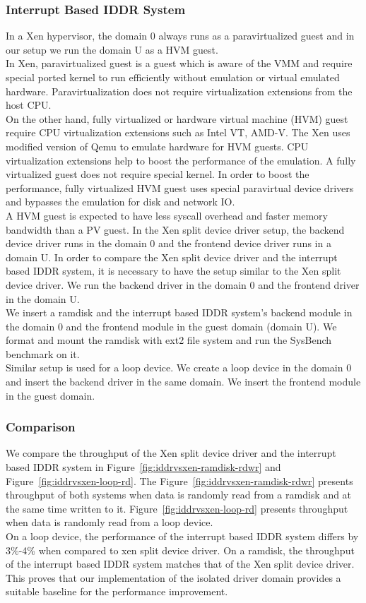 \subsubsection*{Interrupt Based IDDR System}
In a Xen hypervisor, the domain 0 always runs as a paravirtualized guest and in our setup we run the domain U as a HVM guest.
\\[3mm] 
In Xen, paravirtualized guest is a guest which is aware of the VMM and require special ported kernel to run efficiently without emulation or virtual emulated hardware. Paravirtualization does not require virtualization extensions from the host CPU. 
\\[3mm]
On the other hand, fully virtualized or hardware virtual machine (HVM) guest require CPU virtualization extensions such as Intel VT, AMD-V. The Xen uses modified version of Qemu to emulate hardware for HVM guests. CPU virtualization extensions help to boost the performance of the emulation. A fully virtualized guest does not require special kernel. In order to boost the performance, fully virtualized HVM guest uses special paravirtual device drivers and bypasses the emulation for disk and network IO.
\\[3mm]
A HVM guest is expected to have less syscall overhead and faster memory bandwidth than a PV guest. In the Xen split device driver setup, the backend device driver runs in the domain 0 and the frontend device driver runs in a domain U. In order to compare the Xen split device driver and the interrupt based IDDR system, it is necessary to have the setup similar to the Xen split device driver. We run the backend driver in the domain 0 and the frontend driver in the domain U.
\\[3mm]
We insert a ramdisk and the interrupt based IDDR system's backend module in the domain 0 and the frontend module in the guest domain (domain U). We format and mount the ramdisk with ext2 file system and run the SysBench benchmark on it.  
\\[3mm]
Similar setup is used for a loop device. We create a loop device in the domain 0 and insert the backend driver in the same domain. We insert the frontend module in the guest domain.

\subsubsection*{Comparison }
We compare the throughput of the Xen split device driver and the interrupt based IDDR system in Figure~\ref{fig:iddrvsxen-ramdisk-rdwr} and Figure~\ref{fig:iddrvsxen-loop-rd}. The Figure~\ref{fig:iddrvsxen-ramdisk-rdwr} presents throughput of both systems when data is randomly read from a ramdisk and at the same time written to it. Figure~\ref{fig:iddrvsxen-loop-rd} presents throughput when data is randomly read from a loop device. 
\\[3mm]
On a loop device, the performance of the interrupt based IDDR system differs by 3\%-4\% when compared to xen split device driver. On a ramdisk, the throughput of the interrupt based IDDR system matches that of the Xen split device driver. This proves that our implementation of the isolated driver domain provides a suitable baseline for the performance improvement.

